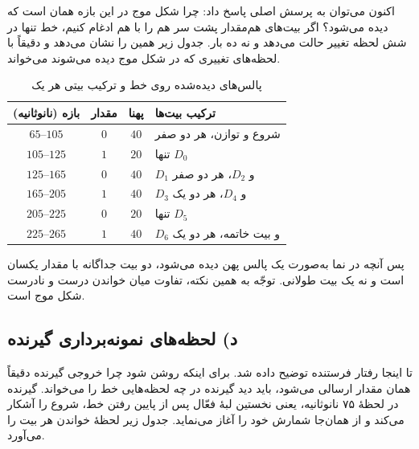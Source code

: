 \documentclass[12pt,a4paper]{article}
\begin{document}
	اکنون می‌توان به پرسش اصلی پاسخ داد: چرا شکل موج  در این بازه همان است که دیده می‌شود؟ اگر بیت‌های هم‌مقدار پشت سر هم را با هم ادغام کنیم، خط  تنها در شش لحظه تغییر حالت می‌دهد و نه ده بار. جدول زیر همین را نشان می‌دهد و دقیقاً با لحظه‌های تغییری که در شکل موج دیده می‌شوند می‌خواند.

	\begin{table}[H]
		\centering
		\footnotesize
		\begin{tabular}{|c|c|c|l|}
			\hline
			\textbf{بازه (نانوثانیه)} & \textbf{مقدار} & \textbf{پهنا} & \textbf{ترکیب بیت‌ها} \\ \hline
			\(65\)--\(105\)  & \(0\) & \(40\) & شروع و توازن، هر دو صفر \\ \hline
			\(105\)--\(125\) & \(1\) & \(20\) & تنها \(D_0\) \\ \hline
			\(125\)--\(165\) & \(0\) & \(40\) & \(D_1\) و \(D_2\)، هر دو صفر \\ \hline
			\(165\)--\(205\) & \(1\) & \(40\) & \(D_3\) و \(D_4\)، هر دو یک \\ \hline
			\(205\)--\(225\) & \(0\) & \(20\) & تنها \(D_5\) \\ \hline
			\(225\)--\(265\) & \(1\) & \(40\) & \(D_6\) و بیت خاتمه، هر دو یک \\ \hline
		\end{tabular}
		\caption{پالس‌های دیده‌شده روی خط  و ترکیب بیتی هر یک}
	\end{table}

	پس آنچه در نما به‌صورت یک پالس پهن دیده می‌شود، دو بیت جداگانه با مقدار یکسان است و نه یک بیت طولانی. توجّه به همین نکته، تفاوت میان خواندن درست و نادرست شکل موج  است.


	\subsection*{د) لحظه‌های نمونه‌برداری گیرنده}
	تا اینجا رفتار فرستنده توضیح داده شد. برای اینکه روشن شود چرا خروجی گیرنده دقیقاً همان مقدار ارسالی می‌شود، باید دید گیرنده در چه لحظه‌هایی خط را می‌خواند. گیرنده در لحظهٔ ۷۵ نانوثانیه، یعنی نخستین لبهٔ فعّال پس از پایین رفتن خط، شروع را آشکار می‌کند و از همان‌جا شمارش خود را آغاز می‌نماید. جدول زیر لحظهٔ خواندن هر بیت را می‌آورد.
\end{document}
